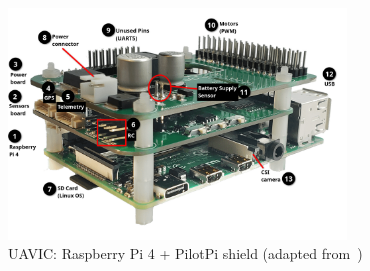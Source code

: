 \begin{figure}[!hbt]
  \centering
  \includegraphics[width=0.8\textwidth]{./img/png/pilotpi-annotated} 
  \caption[UAVIC: Raspberry Pi 4 + PilotPi shield]{UAVIC: Raspberry Pi 4 +
    PilotPi shield (adapted from~\cite{px4-pilotpi})\footnotemark}%
  \label{fig:pilotpi-annot}
\end{figure}
%
%








